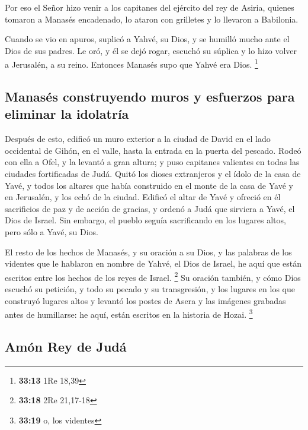  Por eso el Señor hizo venir a los capitanes del ejército
del rey de Asiria, quienes tomaron a Manasés encadenado, lo ataron con
grilletes y lo llevaron a Babilonia.

 Cuando se vio en apuros, suplicó a Yahvé, su Dios, y se
humilló mucho ante el Dios de sus padres.  Le oró, y él
se dejó rogar, escuchó su súplica y lo hizo volver a Jerusalén, a su
reino. Entonces Manasés supo que Yahvé era Dios. \footnote{\textbf{33:13}
  1Re 18,39}

\hypertarget{manasuxe9s-construyendo-muros-y-esfuerzos-para-eliminar-la-idolatruxeda}{%
\subsection{Manasés construyendo muros y esfuerzos para eliminar la
idolatría}\label{manasuxe9s-construyendo-muros-y-esfuerzos-para-eliminar-la-idolatruxeda}}

 Después de esto, edificó un muro exterior a la ciudad de
David en el lado occidental de Gihón, en el valle, hasta la entrada en
la puerta del pescado. Rodeó con ella a Ofel, y la levantó a gran
altura; y puso capitanes valientes en todas las ciudades fortificadas de
Judá.  Quitó los dioses extranjeros y el ídolo de la casa
de Yavé, y todos los altares que había construido en el monte de la casa
de Yavé y en Jerusalén, y los echó de la ciudad.  Edificó
el altar de Yavé y ofreció en él sacrificios de paz y de acción de
gracias, y ordenó a Judá que sirviera a Yavé, el Dios de Israel.
 Sin embargo, el pueblo seguía sacrificando en los
lugares altos, pero sólo a Yavé, su Dios.

 El resto de los hechos de Manasés, y su oración a su
Dios, y las palabras de los videntes que le hablaron en nombre de Yahvé,
el Dios de Israel, he aquí que están escritos entre los hechos de los
reyes de Israel. \footnote{\textbf{33:18} 2Re 21,17-18} 
Su oración también, y cómo Dios escuchó su petición, y todo su pecado y
su transgresión, y los lugares en los que construyó lugares altos y
levantó los postes de Asera y las imágenes grabadas antes de humillarse:
he aquí, están escritos en la historia de Hozai. \footnote{\textbf{33:19}
  o, los videntes}

\hypertarget{amuxf3n-rey-de-juduxe1}{%
\subsection{Amón Rey de Judá}\label{amuxf3n-rey-de-juduxe1}}

